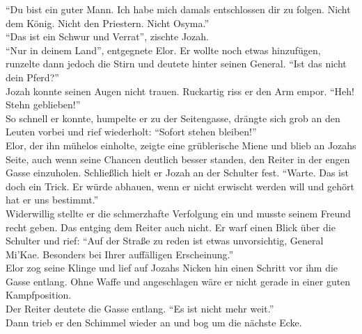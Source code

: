 ``Du bist ein guter Mann. Ich habe mich damals entschlossen dir zu folgen. Nicht dem König. Nicht 
den Priestern. Nicht Osyma.''\\
``Das ist ein Schwur und Verrat'', zischte Jozah.\\
``Nur in deinem Land'', entgegnete Elor. Er wollte noch etwas hinzufügen, runzelte dann jedoch die 
Stirn und deutete hinter seinen General. ``Ist das nicht dein Pferd?''\\
Jozah konnte seinen Augen nicht trauen. Ruckartig riss er den Arm empor. ``Heh! Stehn geblieben!''\\
So schnell er konnte, humpelte er zu der Seitengasse, drängte sich grob an den Leuten vorbei und 
rief wiederholt: ``Sofort stehen bleiben!''\\
Elor, der ihn mühelos einholte, zeigte eine grüblerische Miene und blieb an Jozahs Seite, auch wenn 
seine Chancen deutlich besser standen, den Reiter in der engen Gasse einzuholen. Schließlich hielt 
er Jozah an der Schulter fest. ``Warte. Das ist doch ein Trick. Er würde abhauen, wenn er nicht 
erwischt werden will und gehört hat er uns bestimmt.''\\
Widerwillig stellte er die schmerzhafte Verfolgung ein und musste seinem Freund recht geben. Das 
entging dem Reiter auch nicht. Er warf einen Blick über die Schulter und rief: ``Auf der Straße zu 
reden ist etwas unvorsichtig, General Mi'Kae. Besonders bei Ihrer auffälligen Erscheinung.''\\
Elor zog seine Klinge und lief auf Jozahs Nicken hin einen Schritt vor ihm die Gasse entlang. Ohne 
Waffe und angeschlagen wäre er nicht gerade in einer guten Kampfposition.\\
Der Reiter deutete die Gasse entlang. ``Es ist nicht mehr weit.''\\ 
Dann trieb er den Schimmel wieder an und bog um die nächste Ecke.\\


